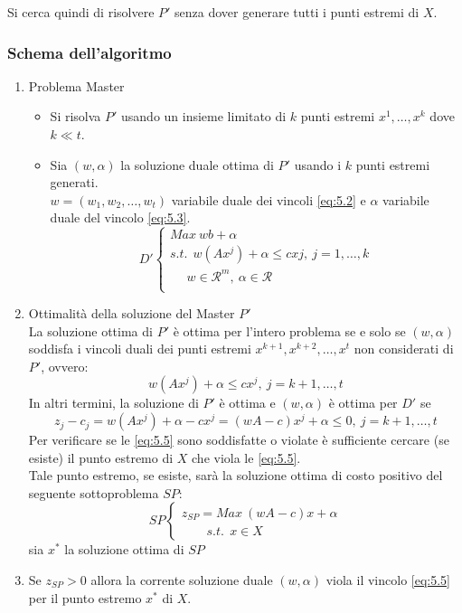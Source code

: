 Si cerca quindi di risolvere $P'$ senza dover generare tutti i punti estremi di $X$.

\newpage
\subsubsection{Schema dell'algoritmo}
\begin{enumerate}
	\item Problema Master
		\begin{itemize}
			\item Si risolva $P'$ usando un insieme limitato di $k$ punti estremi $x^{1},\dots,x^{k}$ dove $k\ll t$.
			\item Sia $(w,\alpha)$ la soluzione duale ottima di $P'$ usando i $k$ punti estremi generati.\\
			$w=(w_{1},w_{2},\dots,w_{t})$ variabile duale dei vincoli \ref{eq:5.2} e $\alpha$ variabile duale del vincolo \ref{eq:5.3}.
			\begin{equation*}
				D'
				\begin{cases}
					Max\ w b+\alpha \\
					s.t.\ \ w(Ax^{j})+\alpha\le cx{j},\ j=1,\dots,k \\
					\ \ \ \ \ \ w\in\mathscr{R}^{m},\ \alpha\in\mathscr{R} \\
				\end{cases}
			\end{equation*}
		\end{itemize}
	\item Ottimalità della soluzione del Master $P'$\\
	La soluzione ottima di $P'$ è ottima per l'intero problema se e solo se $(w,\alpha)$ soddisfa i vincoli duali dei punti estremi $x^{k+1},x^{k+2},\dots,x^{t}$ non considerati di $P'$, ovvero:
	\begin{equation*}
		w(Ax^{j})+\alpha\le cx^{j},\ j=k+1,\dots,t
	\end{equation*}
	In altri termini, la soluzione di $P'$ è ottima e $(w,\alpha)$ è ottima per $D'$ se
	\begin{equation}
		z_{j}-c_{j}=w(Ax^{j})+\alpha-cx^{j}=(w A-c)x^{j}+\alpha\le 0,\ j=k+1,\dots,t \label{eq:5.5}
	\end{equation}
	Per verificare se le \ref{eq:5.5} sono soddisfatte o violate è sufficiente cercare (se esiste) il punto estremo di $X$ che viola le \ref{eq:5.5}.\\
	Tale punto estremo, se esiste, sarà la soluzione ottima di costo positivo del seguente sottoproblema $SP$:
	\begin{equation*}
		SP
		\begin{cases}
			z_{SP}=Max\ (w A-c)x+\alpha \\
			\ \ \ \ \ \ \ \ \ s.t.\ \ x\in X
		\end{cases}
	\end{equation*}
	sia $x^{*}$ la soluzione ottima di $SP$
	\item Se $z_{SP}>0$ allora la corrente soluzione duale $(w,\alpha)$ viola il vincolo \ref{eq:5.5} per il punto estremo $x^{*}$ di $X$.
	

\end{enumerate}
